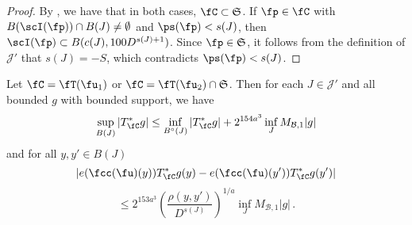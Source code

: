     \begin{proof}
        By , we have that in both cases, $\fC \subset \mathfrak{S}$. If $\fp \in \fC$ with $B(\scI(\fp)) \cap B(J) \neq \emptyset$ and $\ps(\fp) < s(J)$, then $\scI(\fp) \subset B(c(J), 100 D^{s(J) + 1})$. Since $\fp \in \mathfrak{S}$, it follows from the definition of $\mathcal{J}'$ that $s(J) = -S$, which contradicts $\ps(\fp) < s(J)$.
    \end{proof}

    \begin{lemma}
        \label{global-tree-control-1}
        Let $\fC = \fT(\fu_1)$ or $\fC = \fT(\fu_2) \cap \mathfrak{S}$. Then for each $J \in \mathcal{J}'$ and all bounded $g$ with bounded support, we have
        \begin{align}
            \label{TreeUB}
            \sup_{B(J)} |T_{\fC}^*g| \leq \inf_{B^\circ{}(J)} |T^*_{\fC} g| + 2^{154a^3} \inf_{J} M_{\mathcal{B}, 1} |g|
        \end{align}
        and for all $y,y' \in B(J)$
        $$
            |e(\fcc(\fu)(y)) T_{\fC}^* g(y) - e(\fcc(\fu)(y')) T_{\fC}^* g(y')|
        $$
        \begin{equation}
            \label{TreeHolder}
             \le 2^{153a^3} \left(\frac{\rho(y,y')}{D^{s(J)}}\right)^{1/a} \inf_J M_{\mathcal{B},1} |g|\,.
        \end{equation}
    \end{lemma}

